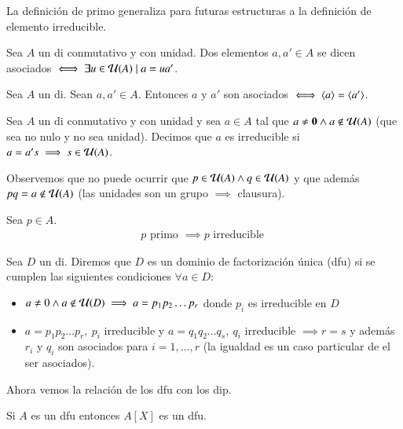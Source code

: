 La definición de primo generaliza para futuras estructuras a la definición de elemento irreducible.

\begin{dfn}
	Sea $A$ un \gls{di} conmutativo y con unidad. Dos elementos $a,a' \in A$ se dicen asociados $\iff \exists u \in \mathcal{U}(A) \mid a = ua'$.
\end{dfn}

\begin{pro}
	Sea $A$ un \gls{di}. Sean $a,a' \in A$. Entonces $a$ y $a'$ son asociados $\iff \langle a\rangle = \langle a'\rangle$.
\end{pro}

\begin{dfn}
	Sea $A$ un \gls{di} conmutativo y con unidad y sea $a \in A$ tal que $a \neq \mathbf{0} \land a \notin \mathcal{U}(A)$ (que sea no nulo y no sea unidad). Decimos que $a$ es irreducible si $a = a's \implies s \in \mathcal{U}(A)$.
\end{dfn}

Observemos que no puede ocurrir que $p \in \mathcal{U}(A) \land q \in \mathcal{U}(A)$ y que además $pq = a \notin \mathcal{U}(A)$ (las unidades son un grupo $\implies$ clausura).


\begin{pro}
	Sea $p \in A$.
	\begin{align*}
		p \text{ primo } \implies p \text{ irreducible }
	\end{align*}
\end{pro}

\begin{dfn}
	\label{dfn:dfu}
	Sea $D$ un \gls{di}. Diremos que $D$ es un dominio de factorización única (\gls{dfu}) si se cumplen las siguientes condiciones $\forall a \in D$:
	\begin{itemize}
		\item $a \neq 0 \land a \not\in\mathcal{U}(D) \implies a = p_1p_2\dots p_r$ donde $p_i$ es irreducible en $D$
		\item $a = p_1p_2\dots p_r,\ p_i$ irreducible y $a = q_1q_2 \dots q_s,\ q_i$ irreducible $\implies r = s$ y además $r_i$ y $q_i$ son asociados para $i = 1, \dots, r$ (la igualdad es un caso particular de el ser asociados).
	\end{itemize}
\end{dfn}

Ahora vemos la relación de los \gls{dfu} con los \gls{dip}.

\begin{pro}
	Si $A$ es un \gls{dfu} entonces $A[X]$ es un \gls{dfu}.
\end{pro}

